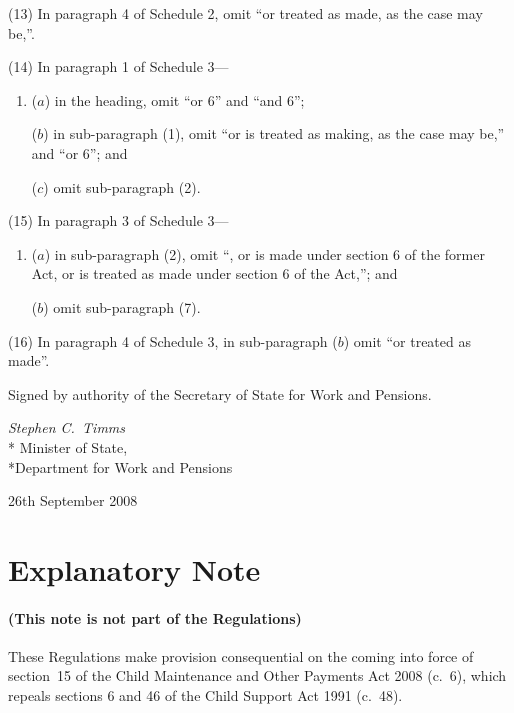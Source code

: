 \documentclass[12pt,a4paper]{article}
\begin{document}
(13) In paragraph 4 of Schedule 2, omit “or treated as made, as the case may be,”.

(14) In paragraph 1 of Schedule 3—
\begin{enumerate}\item[]
($a$) in the heading, omit “or 6” and “and 6”;

($b$) in sub-paragraph (1), omit “or is treated as making, as the case may be,” and “or 6”; and

($c$) omit sub-paragraph (2).
\end{enumerate}

(15) In paragraph 3 of Schedule 3—
\begin{enumerate}\item[]
($a$) in sub-paragraph (2), omit “, or is made under section 6 of the former Act, or is treated as made under section 6 of the Act,”; and

($b$) omit sub-paragraph (7).
\end{enumerate}

(16) In paragraph 4 of Schedule 3, in sub-paragraph ($b$)  omit “or treated as made”. 

\bigskip

Signed 
by authority of the 
Secretary of State for Work and Pensions.

{\raggedleft
\emph{Stephen C.~Timms}\\*
Minister
of State,\\*Department for Work and Pensions

}

26th September 2008

\small

\part{Explanatory Note}

\renewcommand\parthead{— Explanatory Note}

\subsection*{(This note is not part of the Regulations)}

These Regulations make provision consequential on the coming into force of section~15 of the Child Maintenance and Other Payments Act 2008 (c.~6), which repeals sections 6 and 46 of the Child Support Act 1991 (c.~48).
\end{document}
